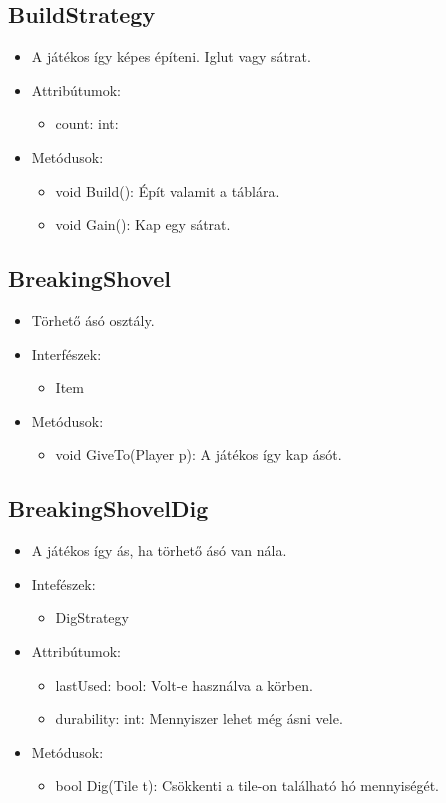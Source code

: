 \subsection{BuildStrategy}
\begin{itemize}
	\item A játékos így képes építeni. Iglut vagy sátrat.
	\item Attribútumok:
	\begin{itemize}
		\item count: int:
	\end{itemize}
	\item Metódusok:
	\begin{itemize}
		\item void Build(): Épít valamit a táblára.
		\item void Gain(): Kap egy sátrat.
	\end{itemize}
\end{itemize}

\subsection{BreakingShovel}
\begin{itemize}	
	\item Törhető ásó osztály.
	\item Interfészek:
	\begin{itemize}
		\item Item
	\end{itemize}
	\item Metódusok:
	\begin{itemize}
		\item void GiveTo(Player p): A játékos így kap ásót.
	\end{itemize}
\end{itemize}

\subsection{BreakingShovelDig}
\begin{itemize}
	\item A játékos így ás, ha törhető ásó van nála.
	\item Intefészek:
	\begin{itemize}
		\item DigStrategy
	\end{itemize}
	\item Attribútumok:
	\begin{itemize}
		\item lastUsed: bool: Volt-e használva a körben.
		\item durability: int: Mennyiszer lehet még ásni vele.
	\end{itemize}
	\item Metódusok:
	\begin{itemize}
		\item bool Dig(Tile t): Csökkenti a tile-on található hó mennyiségét.
	\end{itemize}
\end{itemize}

